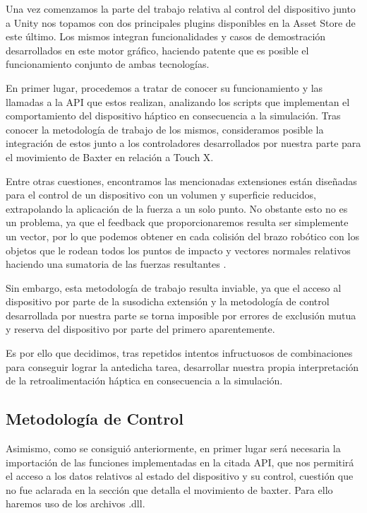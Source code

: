 Una vez comenzamos la parte del trabajo relativa al control del dispositivo junto a Unity nos topamos con dos principales plugins disponibles en la Asset Store de este último. Los mismos integran funcionalidades y casos de demostración desarrollados en este motor gráfico, haciendo patente que es posible el funcionamiento conjunto de ambas tecnologías.

En primer lugar, procedemos a tratar de conocer su funcionamiento y las llamadas a la API que estos realizan, analizando los scripts que implementan el comportamiento del dispositivo háptico en consecuencia a la simulación. Tras conocer la metodología de trabajo de los mismos, consideramos posible la integración de estos junto a los controladores desarrollados por nuestra parte para el movimiento de Baxter en relación a Touch X.

Entre otras cuestiones, encontramos las mencionadas extensiones están diseñadas para el control de un dispositivo con un volumen y superficie reducidos, extrapolando la aplicación de la fuerza a un solo punto. No obstante esto no es un problema, ya que el feedback que proporcionaremos resulta ser simplemente un vector, por lo que podemos obtener en cada colisión del brazo robótico con los objetos que le rodean todos los puntos de impacto y vectores normales relativos haciendo una sumatoria de las fuerzas resultantes \cite{73,74}.  

Sin embargo, esta metodología de trabajo resulta inviable, ya que el acceso al dispositivo por parte de la susodicha extensión y la metodología de control desarrollada por nuestra parte se torna imposible por errores de exclusión mutua y reserva del dispositivo por parte del primero aparentemente.

Es por ello que decidimos, tras repetidos intentos infructuosos de combinaciones para conseguir lograr la antedicha tarea, desarrollar nuestra propia interpretación de la retroalimentación háptica en consecuencia a la simulación.

\subsection{Metodología de Control}
Asimismo, como se consiguió anteriormente, en primer lugar será necesaria la importación de las funciones implementadas en la citada API, que nos permitirá el acceso a los datos relativos al estado del dispositivo y su control, cuestión que no fue aclarada en la sección que detalla el movimiento de baxter. Para ello haremos uso de los archivos .dll.

